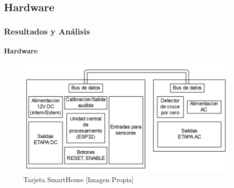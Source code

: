\subsection{Hardware}
\begin{frame}[t]
\frametitle{Resultados y Análisis}
\framesubtitle{Hardware}

\begin{figure}[t]
	\centering
	\caption{Tarjeta SmartHouse [Imagen Propia]}
	\label{fig:tarjeta}
	\includegraphics[width=\linewidth]{Imagenes/Tarjeta}
\end{figure}
\end{frame}



